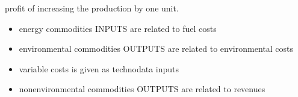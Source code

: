 \documentclass[letterpaper,10pt,english]{sphinxmanual}
\begin{document}
\begin{fulllineitems}
\label{\detokenize{api:muse.quantities.gross_margin}}
profit of increasing the production by one unit.
\begin{itemize}
\item {} 
energy commodities INPUTS are related to fuel costs

\item {} 
environmental commodities OUTPUTS are related to environmental costs

\item {} 
variable costs is given as technodata inputs

\item {} 
non\sphinxhyphen{}environmental commodities OUTPUTS are related to revenues

\end{itemize}

\end{fulllineitems}

\end{document}
